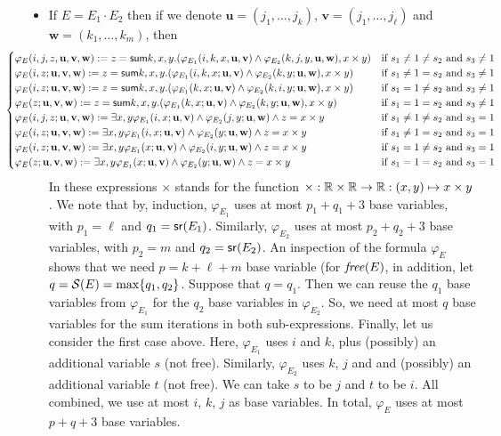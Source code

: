 \begin{itemize}
\item If $E = E_1 \cdot E_2$   then 
if we denote $\mathbf{u}=(j_1,\ldots,j_k)$,
$\mathbf{v}=(j_1,\ldots,j_\ell)$ and 
$\mathbf{w}=(k_1,\ldots,k_m)$, then
\[\hspace{-1.5cm}\begin{cases}
\varphi_E(i,j,z,\mathbf{u},\mathbf{v},\mathbf{w}):=z = \Sum k,x,y . (\varphi_{E_1}(i,k,x,\mathbf{u},\mathbf{v}) \land \varphi_{E_2}(k,j,y,\mathbf{u},\mathbf{w}), x \times y)
 & \text{if } s_1 \neq 1 \neq s_2 \text{ and } s_3 \neq 1
\cr
\varphi_E(i,z;\mathbf{u},\mathbf{v},\mathbf{w}):=z = \Sum k,x,y . (\varphi_{E_1}(i,k,x;\mathbf{u},\mathbf{v}) \land \varphi_{E_2}(k,y;\mathbf{u},\mathbf{w}), x \times y)
& \text{if } s_1 \neq 1 = s_2 \text{ and } s_3 \neq 1
\cr
\varphi_E(i,z;\mathbf{u},\mathbf{v},\mathbf{w}):=z = \Sum k,x,y . (\varphi_{E_1}(k,x;\mathbf{u},\mathbf{v}) \land \varphi_{E_2}(k,i,y;\mathbf{u},\mathbf{w}), x \times y)
  & \text{if } s_1 = 1 \neq s_2 \text{ and } s_3 \neq 1
\cr
\varphi_E(z;\mathbf{u},\mathbf{v},\mathbf{w}):=z = \Sum k,x,y . (\varphi_{E_1}(k,x;\mathbf{u},\mathbf{v}) \land \varphi_{E_2}(k,y;\mathbf{u},\mathbf{w}), x \times y)
 & \text{if } s_1 = 1 = s_2 \text{ and } s_3 \neq 1
\cr
\varphi_E(i,j,z;\mathbf{u},\mathbf{v},\mathbf{w}):=\exists x,y\varphi_{E_1}(i,x;\mathbf{u},\mathbf{v}) \land \varphi_{E_2}(j,y;\mathbf{u},\mathbf{w}) \land z=x \times y
 & \text{if } s_1 \neq 1 \neq s_2 \text{ and } s_3 = 1
\cr
\varphi_E(i,z;\mathbf{u},\mathbf{v},\mathbf{w}):=\exists x,y\varphi_{E_1}(i,x;\mathbf{u},\mathbf{v}) \land \varphi_{E_2}(y;\mathbf{u},\mathbf{w}) \land z=x \times y
 & \text{if } s_1 \neq 1 = s_2 \text{ and } s_3 = 1
\cr
\varphi_E(i,z;\mathbf{u},\mathbf{v},\mathbf{w}):=\exists x,y\varphi_{E_1}(x;\mathbf{u},\mathbf{v}) \land \varphi_{E_2}(i,y;\mathbf{u},\mathbf{w})\land z=x \times y
 & \text{if } s_1 = 1 \neq s_2 \text{ and } s_3 = 1
\cr
\varphi_E(z;\mathbf{u},\mathbf{v},\mathbf{w}):=\exists x,y\varphi_{E_1}(x;\mathbf{u},\mathbf{v}) \land \varphi_{E_2}(y;\mathbf{u},\mathbf{w}) \land z=x \times y
 & \text{if } s_1 = 1 = s_2 \text{ and } s_3 = 1
\cr
\end{cases}
\]
In these expressions $\times$ stands for the function $\times:\mathbb{R}\times \mathbb{R}\to \mathbb{R}:(x,y)\mapsto x\times y$.
We note that by, induction, $\varphi_{E_1}$ uses at most $p_1+q_1+3$ base variables, with $p_1=\ell$ and $q_1=\mathsf{sr}(E_1)$.
Similarly, $\varphi_{E_2}$ uses at most $p_2+q_2+3$ base variables, with $p_2=m$ and $q_2=\mathsf{sr}(E_2)$. An inspection of the
formula $\varphi_E$ shows that we need $p=k+\ell+m$ base variable (for $\operatorname{\mathit{free}}(E)$, in addition, let $q=\mathcal{S}(E)=\max\{q_1,q_2\}$.
Suppose that $q=q_1$. Then we can reuse the $q_1$ base variables from $\varphi_{E_1}$ for the $q_2$ base variables in $\varphi_{E_2}$.
So, we need at most $q$ base variables for the sum iterations in both sub-expressions. Finally, let us consider the first case above. Here,
$\varphi_{E_1}$ uses $i$ and $k$, plus (possibly) an additional variable $s$ (not free). Similarly, $\varphi_{E_2}$ uses $k$, $j$ and
and  (possibly) an additional variable $t$ (not free). We can take $s$ to be $j$ and $t$ to be $i$. All combined, we use at most $i$, $k$, $j$
as base variables. In total, $\varphi_E$ uses at most $p+q+3$ base variables.



\end{itemize}
